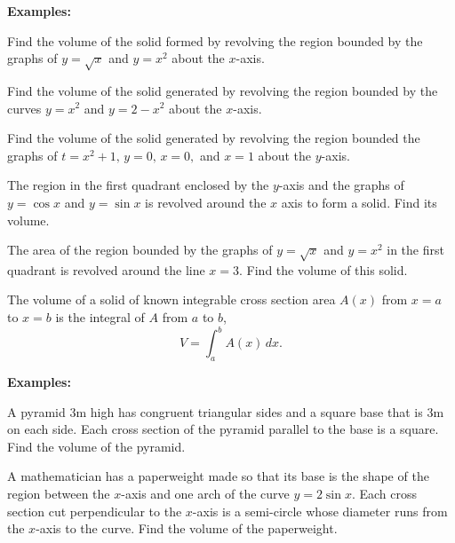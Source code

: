 \documentclass[addpoints, 12pt]{exam}
\begin{document}
\textbf{Examples:}
\begin{questions}
    \question Find the volume of the solid formed by revolving the region bounded by the graphs of $y=\sqrt{x}$ and $y=x^2$ about the $x$-axis.
    
    \question Find the volume of the solid generated by revolving the region bounded by the curves $y=x^2$ and $y=2-x^2$ about the $x$-axis.
    
    \newpage
    
    \question Find the volume of the solid generated by revolving the region bounded the graphs of $t=x^2+1,\,y=0,\,x=0,$ and $x=1$ about the $y$-axis.
    
    \question The region in the first quadrant enclosed by the $y$-axis and the graphs of $y=\cos x$ and $y=\sin x$ is revolved around the $x$ axis to form a solid. Find its volume.
    
    \question The area of the region bounded by the graphs of $y=\sqrt{x}$ and $y=x^2$ in the first quadrant is revolved around the line $x=3$. Find the volume of this solid.
    
\end{questions}

\newpage

\begin{tcolorbox}[title= VOLUME OF KNOWN CROSS SECTION,colframe=black,sharp corners,colback=white,colbacktitle=white,coltitle=black,boxrule=1pt]

    The volume of a solid of known integrable cross section area $A(x)$ from $x=a$ to $x=b$ is the integral of $A$ from $a$ to $b$,
    \[V=\int_a^b A(x)\,dx.\]
    
\end{tcolorbox}
\textbf{Examples:}

\begin{questions}
    \question A pyramid 3m high has congruent triangular sides and a square base that is 3m on each side. Each cross section of the pyramid parallel to the base is a square. Find the volume of the pyramid.
    
    
    \question A mathematician has a paperweight made so that its base is the shape of the region between the $x$-axis and one arch of the curve $y=2\sin x$. Each cross section cut perpendicular to the $x$-axis is a semi-circle whose diameter runs from the $x$-axis to the curve. Find the volume of the paperweight.
\end{questions}
\end{document}
